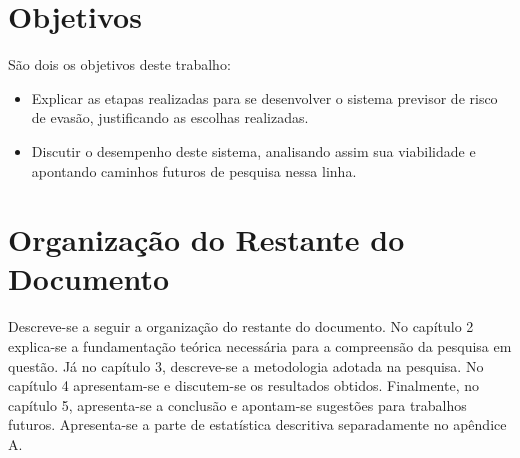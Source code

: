 \section{Objetivos}
São dois os objetivos deste trabalho: 
\begin{itemize}
    \item Explicar as etapas realizadas para se desenvolver o sistema previsor de
        risco de evasão, justificando as escolhas realizadas.
    \item Discutir o desempenho deste sistema, analisando assim sua viabilidade e
        apontando caminhos futuros de pesquisa nessa linha.
\end{itemize}

\section{Organização do Restante do Documento}
\par Descreve-se a seguir a organização do restante do documento. 
No capítulo 2 explica-se a fundamentação teórica necessária para a compreensão da
pesquisa em questão. Já no capítulo 3, descreve-se a metodologia
adotada na pesquisa. No capítulo 4 apresentam-se e discutem-se os resultados
obtidos. Finalmente, no capítulo 5, apresenta-se a conclusão e apontam-se sugestões para
trabalhos futuros. Apresenta-se a parte de estatística descritiva separadamente no
apêndice A. 

